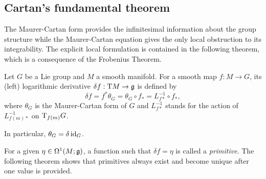 \subsection{Cartan's fundamental theorem}\label{sec: Cartan's fundamental}

The Maurer-Cartan form provides the infinitesimal information about the group structure while the Maurer-Cartan equation gives the only local obstruction to its integrability. The explicit local formulation is contained in the following theorem, which is a consequence of the Frobenius Theorem.

\begin{defn}
    Let $G$ be a Lie group and $M$ a smooth manifold. For a smooth map $f:M\to G$, its (left) logarithmic derivative $\delta f:\mathrm{T} M\to \mathfrak{g}$ is defined by
    \[\delta f=f^\ast\theta_G=\theta_G\circ f_\ast=L_{f\ast}^{-1}\circ f_\ast,\]
    where $\theta_G$ is the Maurer-Cartan form of $G$ and $L_{f\ast}^{-1}$ stands for the action of $L_{f(m)\ast}^{-1}$ on $\mathrm{T}_{f(m)}G$.
    
    In particular, $\theta_G=\delta\operatorname{id}_G$.
\end{defn}

For a given $\eta\in \Omega^1(M;\mathfrak{g})$, a function such that $\delta f=\eta$ is called a \emph{primitive}. The following theorem shows that primitives always exist and become unique after one value is provided.

